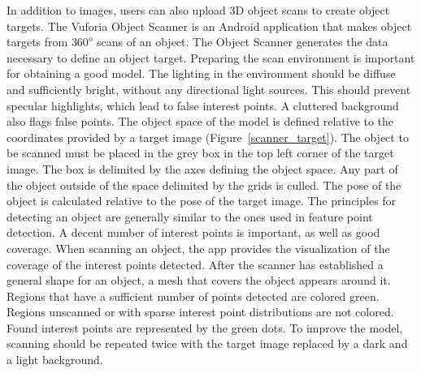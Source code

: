 In addition to images, users can also upload 3D object scans to create object targets. The Vuforia Object Scanner is an Android application that makes object targets from $360^o$ scans of an object. The Object Scanner generates the data necessary to define an object target. Preparing the scan environment is important for obtaining a good model. The lighting in the environment should be diffuse and sufficiently bright, without any directional light sources. This should prevent specular highlights, which lead to false interest points. A cluttered background also flags false points. The object space of the model is defined relative to the coordinates provided by a target image (Figure~\ref{scanner_target}). The object to be scanned must be placed in the grey box in the top left corner of the target image. The box is delimited by the axes defining the object space. Any part of the object outside of the space delimited by the grids is culled. The pose of the object is calculated relative to the pose of the target image. The principles for detecting an object are generally similar to the ones used in feature point detection. A decent number of interest points is important, as well as good coverage. When scanning an object, the app provides the visualization of the coverage of the interest points detected. After the scanner has established a general shape for an object, a mesh that covers the object appears around it. Regions that have a sufficient number of points detected are colored green. Regions unscanned or with sparse interest point distributions are not colored. Found interest points are represented by the green dots. To improve the model, scanning should be repeated twice with the target image replaced by a dark and a light background.

\begin{figure}[!ht]
\end{figure}

\begin{figure}[!ht]
\end{figure}

